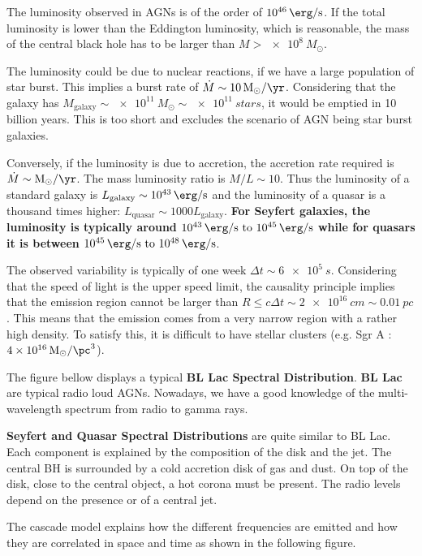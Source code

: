 \documentclass[10pt,a4paper,english]{article}
\begin{document}
The luminosity observed in AGNs is of the order of $\SI{e46}{\erg\per\s}$. If
the total luminosity is lower than the Eddington luminosity, which is
reasonable, the mass of the central black hole has to be larger than $M >
\SI{e8}{M_\odot}$.

The luminosity could be due to nuclear reactions, if we have a large population
of star burst. This implies a burst rate of $\dot{M} \sim
\SI{10}{M_\odot\per\yr}$. Considering that the galaxy has $M_\mathrm{galaxy}
\sim \SI{e11}{M_\odot} \sim \SI{e11}{stars}$, it would be emptied in 10 billion
years. This is too short and excludes the scenario of AGN being star burst
galaxies.

Conversely, if the luminosity is due to accretion, the accretion rate required
is $\dot{M} \sim \si{M_\odot\per\yr}$. The mass luminosity ratio is $M/L \sim
10$. Thus the luminosity of a standard galaxy is $L_\mathrm{galaxy} \sim
\SI{e43}{\erg\per\s}$ and the luminosity of a quasar is a thousand times
higher: $L_\mathrm{quasar}\sim 1000 L_\mathrm{galaxy}$. \textbf{For Seyfert
galaxies, the luminosity is typically around $\SIrange{e43}{e45}{\erg\per\s}$
while for quasars it is between $\SIrange{e45}{e48}{\erg\per\s}$}.

The observed variability is typically of one week $\Delta t \sim \SI{6e5}{s}$.
Considering that the speed of light is the upper speed limit, the causality
principle implies that the emission region cannot be larger than $R \leq
c\Delta t \sim \SI{2e16}{cm} \sim \SI{0.01}{pc}$. This means that the emission
comes from a very narrow region with a rather high density. To satisfy this, it
is difficult to have stellar clusters (e.g. Sgr A :
$\SI{4e16}{M_\odot\per\pc^3}$).

The figure bellow  displays a typical \textbf{BL Lac
Spectral Distribution}. \textbf{BL Lac} are typical radio loud AGNs. Nowadays,
we have a good knowledge of the multi-wavelength spectrum from radio to gamma
rays.

\textbf{Seyfert and Quasar Spectral Distributions} are quite similar to BL Lac.
Each component is explained by the composition of the disk and the jet. The
central BH is surrounded by a cold accretion disk of gas and dust. On top of
the disk, close to the central object, a hot corona must be present. The radio
levels depend on the presence or of a central jet.  

The cascade model explains how the different frequencies are emitted and how
they are correlated in space and time as shown in the following figure.
\end{document}
